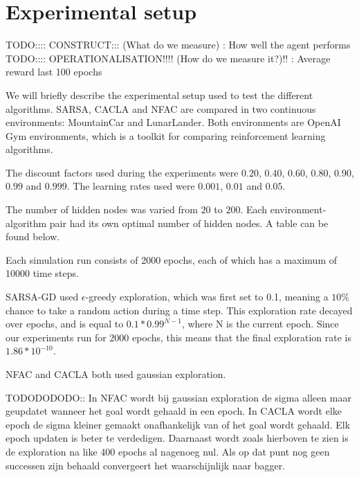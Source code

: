  
\section{Experimental setup}
TODO:::: CONSTRUCT::: (What do we measure) : How well the agent performs
TODO:::: OPERATIONALISATION!!!! (How do we measure it?)!! : Average reward last 100 epochs

We will briefly describe the experimental setup used to test the different algorithms. SARSA, CACLA and NFAC are compared in two continuous environments: MountainCar\cite{openaimountaincar} and LunarLander\cite{openailunarlander}. Both environments are OpenAI Gym environments\cite{openaigym}, which is a toolkit for comparing reinforcement learning algorithms. 

The discount factors used during the experiments were $0.20$, $0.40$, $0.60$, $0.80$, $0.90$, $0.99$ and $0.999$. The learning rates used were $0.001$, $0.01$ and $0.05$.

The number of hidden nodes was varied from $20$ to $200$. Each environment-algorithm pair had its own optimal number of hidden nodes. A table can be found below. 

Each simulation run consists of 2000 epochs, each of which has a maximum of 10000 time steps. 


SARSA-GD used $\epsilon$-greedy exploration, which was first set to 0.1, meaning a $10\%$ chance to take a random action during a time step. This exploration rate decayed over epochs, and is equal to $0.1 * 0.99^{N-1}$, where N is the current epoch. Since our experiments run for 2000 epochs, this means that the final exploration rate is $1.86*10^{-10}$.   

NFAC and CACLA both used gaussian exploration. 

TODODODODO:: In NFAC wordt bij gaussian exploration de sigma alleen maar geupdatet wanneer het goal wordt gehaald in een epoch. In CACLA wordt elke epoch de sigma kleiner gemaakt onafhankelijk van of het goal wordt gehaald. Elk epoch updaten is beter te verdedigen. Daarnaast wordt zoals hierboven te zien is de exploration na like 400 epochs al nagenoeg nul. Als op dat punt nog geen successen zijn behaald convergeert het waarschijnlijk naar bagger. 


